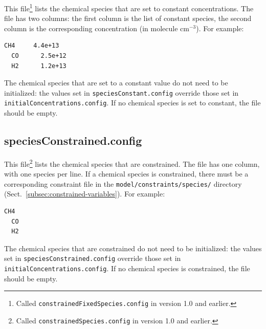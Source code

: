This file\footnote{Called \texttt{constrainedFixedSpecies.config} in version 1.0 and earlier.}
lists the chemical species that are set to constant concentrations. The file has two columns:
the first column is the list of constant species, the second column is the corresponding
concentration (in molecule cm$^{-3}$). For example:

\begin{Verbatim}[fontsize=\small]
  CH4     4.4e+13
  CO      2.5e+12
  H2      1.2e+13
\end{Verbatim}

The chemical species that are set to a constant value do not need to be initialized: the values
set in \texttt{speciesConstant.config} override those set in \texttt{initialConcentrations.config}.
If no chemical species is set to constant, the file should be empty.

\subsection{speciesConstrained.config} \label{subsec:speciesconstrained}

This file\footnote{Called \texttt{constrainedSpecies.config} in version 1.0 and earlier.}
lists the chemical species that are constrained. The file has one column, with one species per
line. If a chemical species is constrained, there must be a corresponding constraint file in
the \texttt{model/constraints/species/} directory (Sect.~\ref{subsec:constrained-variables}).
For example:

\begin{Verbatim}[fontsize=\small]
  CH4
  CO
  H2
\end{Verbatim}

The chemical species that are constrained do not need to be initialized: the values set in
\texttt{speciesConstrained.config} override those set in \texttt{initialConcentrations.config}.
If no chemical species is constrained, the file should be empty.

